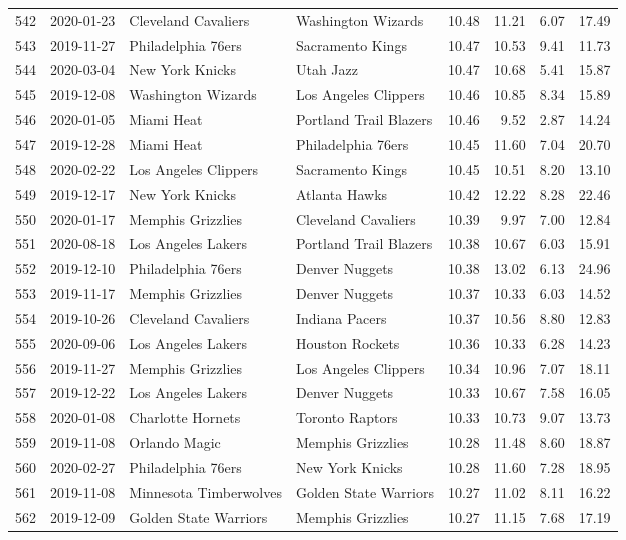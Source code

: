 \documentclass[
  11pt,
]{article}
\theoremstyle{nonumberplain}
\begin{document}
\begin{longtable}{rl|llr|rrr}
542 & 2020-01-23 & Cleveland Cavaliers & Washington Wizards & 10.48 & 11.21 & 6.07 & 17.49\\
543 & 2019-11-27 & Philadelphia 76ers & Sacramento Kings & 10.47 & 10.53 & 9.41 & 11.73\\
544 & 2020-03-04 & New York Knicks & Utah Jazz & 10.47 & 10.68 & 5.41 & 15.87\\
545 & 2019-12-08 & Washington Wizards & Los Angeles Clippers & 10.46 & 10.85 & 8.34 & 15.89\\
546 & 2020-01-05 & Miami Heat & Portland Trail Blazers & 10.46 & 9.52 & 2.87 & 14.24\\
547 & 2019-12-28 & Miami Heat & Philadelphia 76ers & 10.45 & 11.60 & 7.04 & 20.70\\
548 & 2020-02-22 & Los Angeles Clippers & Sacramento Kings & 10.45 & 10.51 & 8.20 & 13.10\\
549 & 2019-12-17 & New York Knicks & Atlanta Hawks & 10.42 & 12.22 & 8.28 & 22.46\\
550 & 2020-01-17 & Memphis Grizzlies & Cleveland Cavaliers & 10.39 & 9.97 & 7.00 & 12.84\\
551 & 2020-08-18 & Los Angeles Lakers & Portland Trail Blazers & 10.38 & 10.67 & 6.03 & 15.91\\
552 & 2019-12-10 & Philadelphia 76ers & Denver Nuggets & 10.38 & 13.02 & 6.13 & 24.96\\
553 & 2019-11-17 & Memphis Grizzlies & Denver Nuggets & 10.37 & 10.33 & 6.03 & 14.52\\
554 & 2019-10-26 & Cleveland Cavaliers & Indiana Pacers & 10.37 & 10.56 & 8.80 & 12.83\\
555 & 2020-09-06 & Los Angeles Lakers & Houston Rockets & 10.36 & 10.33 & 6.28 & 14.23\\
556 & 2019-11-27 & Memphis Grizzlies & Los Angeles Clippers & 10.34 & 10.96 & 7.07 & 18.11\\
557 & 2019-12-22 & Los Angeles Lakers & Denver Nuggets & 10.33 & 10.67 & 7.58 & 16.05\\
558 & 2020-01-08 & Charlotte Hornets & Toronto Raptors & 10.33 & 10.73 & 9.07 & 13.73\\
559 & 2019-11-08 & Orlando Magic & Memphis Grizzlies & 10.28 & 11.48 & 8.60 & 18.87\\
560 & 2020-02-27 & Philadelphia 76ers & New York Knicks & 10.28 & 11.60 & 7.28 & 18.95\\
561 & 2019-11-08 & Minnesota Timberwolves & Golden State Warriors & 10.27 & 11.02 & 8.11 & 16.22\\
562 & 2019-12-09 & Golden State Warriors & Memphis Grizzlies & 10.27 & 11.15 & 7.68 & 17.19\\

\end{longtable}
\end{document}
